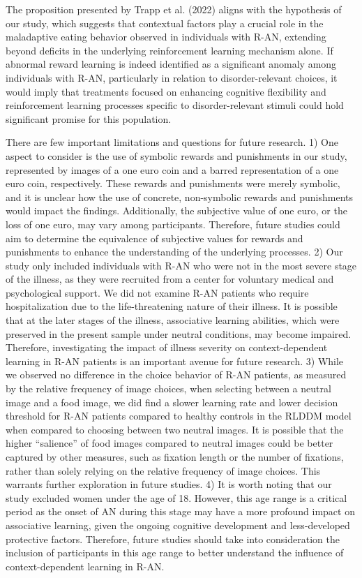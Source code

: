 \documentclass[
  man,floatsintext]{apa6}
\begin{document}
The proposition presented by Trapp et al. (2022) aligns with the hypothesis of our study, which suggests that contextual factors play a crucial role in the maladaptive eating behavior observed in individuals with R-AN, extending beyond deficits in the underlying reinforcement learning mechanism alone. If abnormal reward learning is indeed identified as a significant anomaly among individuals with R-AN, particularly in relation to disorder-relevant choices, it would imply that treatments focused on enhancing cognitive flexibility and reinforcement learning processes specific to disorder-relevant stimuli could hold significant promise for this population.

There are few important limitations and questions for future research. 1) One aspect to consider is the use of symbolic rewards and punishments in our study, represented by images of a one euro coin and a barred representation of a one euro coin, respectively. These rewards and punishments were merely symbolic, and it is unclear how the use of concrete, non-symbolic rewards and punishments would impact the findings. Additionally, the subjective value of one euro, or the loss of one euro, may vary among participants. Therefore, future studies could aim to determine the equivalence of subjective values for rewards and punishments to enhance the understanding of the underlying processes. 2) Our study only included individuals with R-AN who were not in the most severe stage of the illness, as they were recruited from a center for voluntary medical and psychological support. We did not examine R-AN patients who require hospitalization due to the life-threatening nature of their illness. It is possible that at the later stages of the illness, associative learning abilities, which were preserved in the present sample under neutral conditions, may become impaired. Therefore, investigating the impact of illness severity on context-dependent learning in R-AN patients is an important avenue for future research. 3) While we observed no difference in the choice behavior of R-AN patients, as measured by the relative frequency of image choices, when selecting between a neutral image and a food image, we did find a slower learning rate and lower decision threshold for R-AN patients compared to healthy controls in the RLDDM model when compared to choosing between two neutral images. It is possible that the higher ``salience'' of food images compared to neutral images could be better captured by other measures, such as fixation length or the number of fixations, rather than solely relying on the relative frequency of image choices. This warrants further exploration in future studies. 4) It is worth noting that our study excluded women under the age of 18. However, this age range is a critical period as the onset of AN during this stage may have a more profound impact on associative learning, given the ongoing cognitive development and less-developed protective factors. Therefore, future studies should take into consideration the inclusion of participants in this age range to better understand the influence of context-dependent learning in R-AN.
\end{document}
